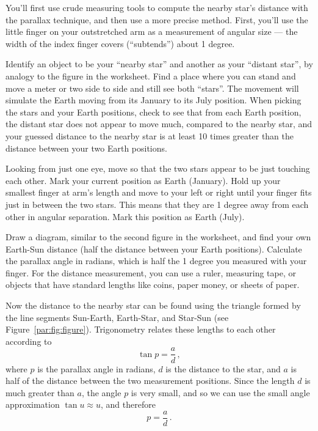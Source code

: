 You'll first use crude measuring tools to compute the nearby star's distance with the parallax technique, and then use a more precise method. First, you'll use the little finger on your outstretched arm as a measurement of angular size --- the width of the index finger covers (``subtends'') about 1 degree.

\begin{steps}
	\item Identify an object to be your ``nearby star'' and another as your ``distant star'', by analogy to the figure in the worksheet. Find a place where you can stand and move a meter or two side to side and still see both ``stars''. The movement will simulate the Earth moving from its January to its July position. When picking the stars and your Earth positions, check to see that from each Earth position, the distant star does not appear to move much, compared to the nearby star, and your guessed distance to the nearby star is at least 10 times greater than the distance between your two Earth positions.
	
	\item Looking from just one eye, move so that the two stars appear to be just touching each other. Mark your current position as Earth (January). Hold up your smallest finger at arm's length and move to your left or right until your finger fits just in between the two stars. This means that they are 1 degree away from each other in angular separation. Mark this position as Earth (July).
	
	\item Draw a diagram, similar to the second figure in the worksheet, and find your own Earth-Sun distance (half the distance between your Earth positions). Calculate the parallax angle in radians, which is half the 1 degree you measured with your finger. For the distance measurement, you can use a ruler, measuring tape, or objects that have standard lengths like coins, paper money, or sheets of paper.
\end{steps}
	
Now the distance to the nearby star can be found using the triangle formed by the line segments Sun-Earth, Earth-Star, and Star-Sun (see Figure~\ref{par:fig:figure}). Trigonometry relates these lengths to each other according to
\begin{equation}
	\tan p = \frac{a}{d}\,,
\end{equation}
where $p$ is the parallax angle in radians, $d$ is the distance to the star, and $a$ is half of the distance between the two measurement positions. Since the length $d$ is much greater than $a$, the angle $p$ is very small, and so we can use the small angle approximation $\tan u \approx u$, and therefore
\begin{equation}
	p = \frac{a}{d}\,.
\end{equation}


